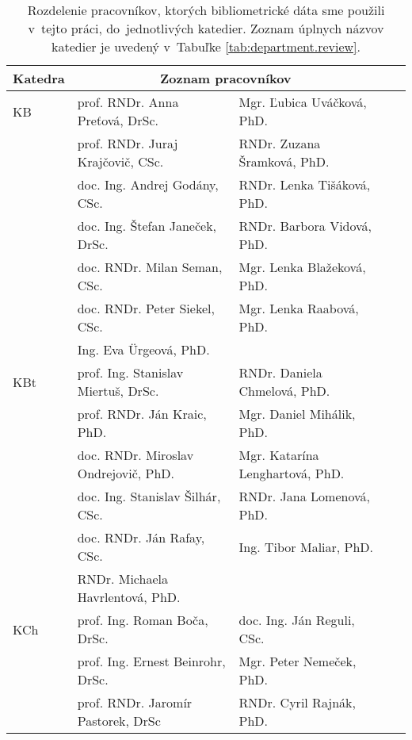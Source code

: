   \begin{table}
    \caption[Rozdelenie pracovníkov do jednotlivých katedier]{Rozdelenie
      pracovníkov, ktorých bibliometrické dáta sme použili v~tejto práci,
      do~jednotlivých katedier. Zoznam úplnych názvov katedier je uvedený v~Tabuľke
      \ref{tab:department.review}.}
    \label{tab:staff.list}
  \centering\small
  \begin{tabularx}{\textwidth}{lllll}
    \toprule\noalign{\vspace{.3ex}}
     Katedra& \multicolumn{2}{c}{Zoznam pracovníkov}                  \\[0.3ex]
    \midrule\noalign{\vspace{.5ex}}
    KB   & prof. RNDr. Anna Preťová, DrSc. &  Mgr. Ľubica Uváčková, PhD.      \\
         & prof. RNDr. Juraj Krajčovič, CSc.& RNDr. Zuzana Šramková, PhD.       \\
         & doc. Ing. Andrej Godány, CSc. &    RNDr. Lenka Tišáková, PhD.     \\
         & doc. Ing. Štefan Janeček, DrSc.&   RNDr. Barbora Vidová, PhD.      \\
         & doc. RNDr. Milan Seman, CSc. &     Mgr. Lenka Blažeková, PhD.    \\
         & doc. RNDr. Peter Siekel, CSc. &    Mgr. Lenka Raabová, PhD.     \\
         & Ing. Eva Ürgeová, PhD. &    \\ [2ex]
    KBt  & prof. Ing. Stanislav Miertuš, DrSc.  & RNDr. Daniela Chmelová, PhD.            \\
         & prof. RNDr. Ján Kraic, PhD.          & Mgr. Daniel Mihálik, PhD.            \\
         & doc. RNDr. Miroslav Ondrejovič, PhD. & Mgr. Katarína Lenghartová, PhD.            \\
         & doc. Ing. Stanislav Šilhár, CSc.     & RNDr. Jana Lomenová, PhD.            \\
         & doc. RNDr. Ján Rafay, CSc.           & Ing. Tibor Maliar, PhD.            \\
         & RNDr. Michaela Havrlentová, PhD.     &            \\[2ex]
    KCh  & prof. Ing. Roman Boča, DrSc. & doc. Ing. Ján Reguli, CSc. \\
         & prof. Ing. Ernest Beinrohr, DrSc. & Mgr. Peter Nemeček, PhD. \\
         & prof. RNDr. Jaromír Pastorek, DrSc & RNDr. Cyril Rajnák, PhD. \\

\end{tabularx}
\end{table}
